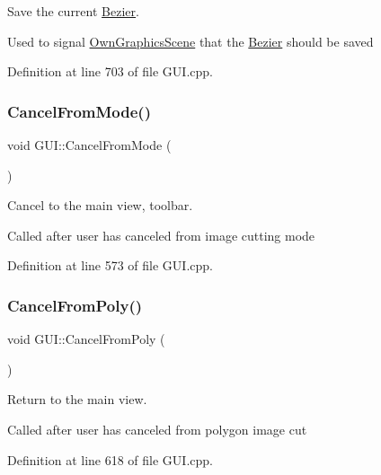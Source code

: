 Save the current \mbox{\hyperlink{classBezier}{Bezier}}. 

Used to signal \mbox{\hyperlink{classOwnGraphicsScene}{Own\+Graphics\+Scene}} that the \mbox{\hyperlink{classBezier}{Bezier}} should be saved 

Definition at line 703 of file G\+U\+I.\+cpp.

\mbox{\label{classGUI_a8188dd01b2dc9354afbbf2f4b18fd19a}} 
\subsubsection{\texorpdfstring{Cancel\+From\+Mode()}{CancelFromMode()}}
{\footnotesize\ttfamily void G\+U\+I\+::\+Cancel\+From\+Mode (\begin{DoxyParamCaption}{ }\end{DoxyParamCaption})}



Cancel to the main view, toolbar. 

Called after user has canceled from image cutting mode 

Definition at line 573 of file G\+U\+I.\+cpp.

\mbox{\label{classGUI_a9f2b3abf533a7c720b817caed653da2e}} 
\subsubsection{\texorpdfstring{Cancel\+From\+Poly()}{CancelFromPoly()}}
{\footnotesize\ttfamily void G\+U\+I\+::\+Cancel\+From\+Poly (\begin{DoxyParamCaption}{ }\end{DoxyParamCaption})}



Return to the main view. 

Called after user has canceled from polygon image cut 

Definition at line 618 of file G\+U\+I.\+cpp.

\mbox{\label{classGUI_a3e6d9c2c9482bf8cb9655899b36e8bc1}} 
